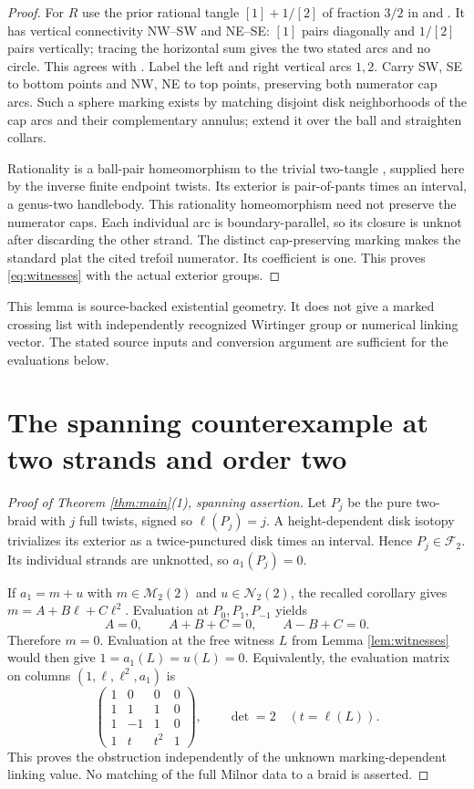 \documentclass[11pt]{article}
\theoremstyle{remark}\newtheorem{remark}[theorem]{Remark}
\newcommand{\M}{\mathcal M}
\newcommand{\N}{\mathcal N}
\newcommand{\F}{\mathcal F}
\begin{document}
\begin{proof}
For $R$ use the prior rational tangle $[1]+1/[2]$ of fraction $3/2$ in
\cite[pp.~20--21, Figure 15]{KL} and
\cite[p.~30, Figure 20]{KLDNA}. It has vertical connectivity
NW--SW and NE--SE: $[1]$ pairs diagonally and $1/[2]$ pairs vertically;
tracing the horizontal sum gives the two stated arcs and no circle.
This agrees with \cite[Theorem 6]{KL}. Label the left and right vertical
arcs $1,2$. Carry SW, SE to bottom points and NW, NE to top points, preserving
both numerator cap arcs. Such a sphere marking exists by matching disjoint
disk neighborhoods of the cap arcs and their complementary annulus;
extend it over the ball and straighten collars.

Rationality is a ball-pair homeomorphism to the trivial two-tangle
\cite[\S2]{KL}, supplied here by the inverse finite endpoint twists.
Its exterior is pair-of-pants times an interval, a genus-two handlebody.
This rationality homeomorphism need not preserve the numerator caps.
Each individual arc is boundary-parallel, so its closure is unknot after
discarding the other strand. The distinct cap-preserving marking makes the
standard plat the cited trefoil numerator. Its coefficient is one.
This proves \eqref{eq:witnesses} with the actual exterior groups.
\end{proof}
This lemma is source-backed existential geometry. It does not give a
marked crossing list with independently recognized Wirtinger group or
numerical linking vector. The stated source inputs and conversion argument
are sufficient for the evaluations below.

\section{The spanning counterexample at two strands and order two}
\begin{proof}[Proof of Theorem \ref{thm:main}(1), spanning assertion]
Let $P_j$ be the pure two-braid with $j$ full twists, signed so
$\ell(P_j)=j$. A height-dependent disk isotopy trivializes its exterior as
a twice-punctured disk times an interval. Hence $P_j\in\F_2$. Its individual
strands are unknotted, so $a_1(P_j)=0$.

If $a_1=m+u$ with $m\in\M_2(2)$ and $u\in\N_2(2)$, the recalled corollary
gives $m=A+B\ell+C\ell^2$. Evaluation at $P_0,P_1,P_{-1}$ yields
\[
A=0,\qquad A+B+C=0,\qquad A-B+C=0.
\]
Therefore $m=0$. Evaluation at the free witness $L$ from
Lemma \ref{lem:witnesses} would then give $1=a_1(L)=u(L)=0$.
Equivalently, the evaluation matrix on columns $(1,\ell,\ell^2,a_1)$ is
\[
\begin{pmatrix}1&0&0&0\\1&1&1&0\\1&-1&1&0\\1&t&t^2&1\end{pmatrix},
\qquad\det=2\quad(t=\ell(L)).
\]
This proves the obstruction independently of the unknown marking-dependent
linking value. No matching of the full Milnor data to a braid is asserted.
\end{proof}
\end{document}
